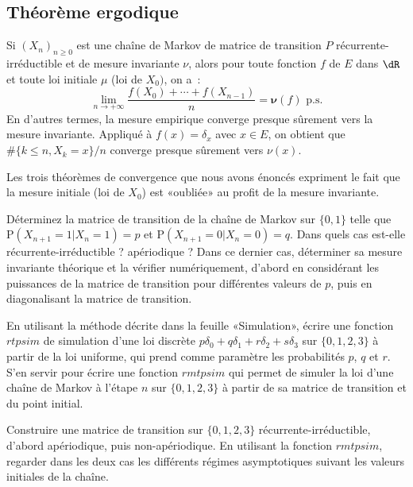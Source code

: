 
%
\subsection{Théorème ergodique}
%

Si $(X_n)_{n\geq 0}$ est une chaîne de Markov de matrice de transition $P$
récurrente-irréductible et de mesure invariante $\nu$, alors pour toute
fonction $f$ de $E$ dans $\dR$ et toute loi initiale $\mu$ (loi de $X_0)$, on
a~:
$$
\lim_{n\to+\infty} \frac{f(X_0) + \cdots + f(X_{n-1})}{n} =
\mathbf{\nu}(f) \text{ p.s.}
$$
En d'autres termes, la mesure empirique converge presque sûrement vers la
mesure invariante. Appliqué à $f(x)=\delta_{x}$ avec $x\in E$, on obtient que
$\#\{k\leq n, X_k = x\}/n$ converge presque sûrement vers $\nu(x)$.

Les trois théorèmes de convergence que nous avons énoncés expriment le fait
que la mesure initiale (loi de $X_0$) est «oubliée» au profit de la mesure
invariante.


\begin{exo}
  Déterminez la matrice de transition de la chaîne de Markov sur $\{0,1\}$ telle
  que $\mathrm{P}(X_{n+1}=1\vert X_n=1)=p$ et $\mathrm{P}(X_{n+1}=0\vert
  X_n=0)=q$. Dans quels cas est-elle récurrente-irréductible ? apériodique ?
  Dans ce dernier cas, déterminer sa mesure invariante théorique et la
  vérifier numériquement, d'abord en considérant les puissances de la matrice
  de transition pour différentes valeurs de $p$, puis en diagonalisant la
  matrice de transition.
\end{exo}

\begin{exo}
  En utilisant la méthode décrite dans la feuille «Simulation», écrire une
  fonction \ML{} $rtpsim$ de simulation d'une loi discrète
  $p\delta_0+q\delta_1+r\delta_2+s\delta_3$ sur $\{0,1,2,3\}$ à partir de la loi uniforme, qui prend
  comme paramètre les probabilités $p$, $q$ et $r$.  S'en servir pour écrire
  une fonction $rmtpsim$ qui permet de simuler la loi d'une chaîne de Markov à
  l'étape $n$ sur $\{0,1,2,3\}$ à partir de sa matrice de transition et du point
  initial.
\end{exo}

\begin{exo}
  Construire une matrice de transition sur $\{0,1,2,3\}$
  récurrente-irréductible, d'abord apériodique, puis non-apériodique. En
  utilisant la fonction $rmtpsim$, regarder dans les deux cas les différents
  régimes asymptotiques suivant les valeurs initiales de la chaîne.
\end{exo}


